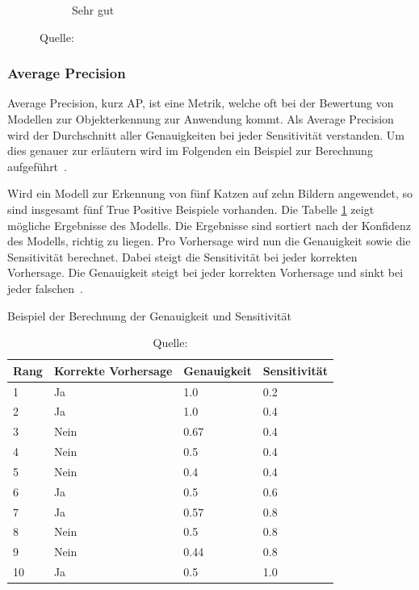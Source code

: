 \begin{figure}[h!]
\begin{subfigure}[b]{0.3\linewidth}
        \caption*{Sehr gut} 
        \vspace{2ex}
    \end{subfigure}
    
    \caption*{Quelle: \textcite{IoU}}
\end{figure}

\subsubsection{Average Precision}
\label{chap:ap}

Average Precision, kurz AP, ist eine Metrik, welche oft bei der Bewertung von Modellen zur Objekterkennung zur Anwendung kommt. Als Average Precision wird der Durchschnitt aller Genauigkeiten bei jeder Sensitivität verstanden. Um dies genauer zur erläutern wird im Folgenden ein Beispiel zur Berechnung aufgeführt~\autocite{AP}.

Wird ein Modell zur Erkennung von fünf Katzen auf zehn Bildern angewendet, so sind insgesamt fünf True Positive Beispiele vorhanden. Die Tabelle \ref{tab:ap-example} zeigt mögliche Ergebnisse des Modells. Die Ergebnisse sind sortiert nach der Konfidenz des Modells, richtig zu liegen. Pro Vorhersage wird nun die Genauigkeit sowie die Sensitivität berechnet. Dabei steigt die Sensitivität bei jeder korrekten Vorhersage. Die Genauigkeit steigt bei jeder korrekten Vorhersage und sinkt bei jeder falschen~\autocite{AP}.

\begin{table}[h!]
    \captionsetup{width=.9\linewidth}
    \caption{Beispiel der Berechnung der Genauigkeit und Sensitivität}
    \label{tab:ap-example}
    \centering
    \begin{tabular}{|l|l|l|l|} 
    \hline
    Rang & Korrekte Vorhersage & Genauigkeit & Sensitivität  \\ 
    \hline
    1    & Ja                  & 1.0         & 0.2           \\ 
    \hline
    2    & Ja                  & 1.0         & 0.4           \\ 
    \hline
    3    & Nein                & 0.67        & 0.4           \\ 
    \hline
    4    & Nein                & 0.5         & 0.4           \\ 
    \hline
    5    & Nein                & 0.4         & 0.4           \\ 
    \hline
    6    & Ja                  & 0.5         & 0.6           \\ 
    \hline
    7    & Ja                  & 0.57        & 0.8           \\ 
    \hline
    8    & Nein                & 0.5         & 0.8           \\ 
    \hline
    9    & Nein                & 0.44        & 0.8           \\ 
    \hline
    10   & Ja                  & 0.5         & 1.0           \\
    \hline
    \end{tabular}
    \vspace*{0.3cm}
    \caption*{Quelle: \textcite{AP}}
\end{table}

